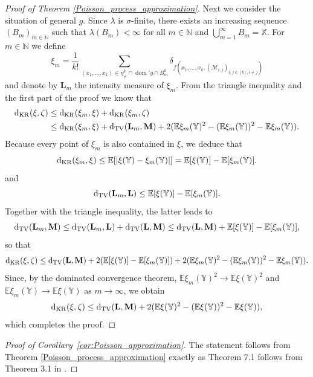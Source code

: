 \documentclass{article}
\theoremstyle{definition}
\numberwithin{equation}{section}
\theoremstyle{remark}
\newcommand{\E}{\mathbb{E}}
\begin{document}
\begin{proof}[Proof of Theorem \ref{Poisson_process_approximation}]
Next we consider the situation of general $g$. Since $\lambda$ is $\sigma$-finite, there exists an increasing sequence $(B_m)_{m\in\mathbb{N}}$ such that $\lambda(B_m)<\infty$ for all $m\in\mathbb{N}$ and $\bigcup_{m=1}^\infty B_m=\mathbb{X}$. For $m\in\mathbb{N}$ we define
$$
\xi_m=\frac{1}{k!}\sum_{(x_1,\ldots,x_k)\in\eta^k_{\neq}\cap \operatorname{dom}'g \cap B_m^k} \delta_{f(x_1,\ldots,x_k,(\mathcal{M}_{i,j})_{i,j\in[k],i\neq j})}
$$
and denote by $\mathbf{L}_m$ the intensity measure of $\xi_m$. From the triangle inequality and the first part of the proof we know that
\begin{align*}
\mathrm{d}_{\rm KR}(\xi,\zeta) & \leq \mathrm{d}_{\rm KR}(\xi_m,\xi) + \mathrm{d}_{\rm KR}(\xi_m,\zeta) \\
			       & \leq  \mathrm{d}_{\rm KR}(\xi_m,\xi) + \mathrm{d}_{\rm TV}(\mathbf{L}_m,\mathbf{M}) + 2(\E\xi_m(\mathbb{Y})^2 - (\E\xi_m(\mathbb{Y}))^2 - \E\xi_m(\mathbb{Y}) ).
\end{align*}
Because every point of $\xi_m$ is also contained in $\xi$, we deduce that
$$
\mathrm{d}_{\rm KR}(\xi_m,\xi) \leq \E[|\xi(\mathbb{Y})-\xi_m(\mathbb{Y})|] = \E[\xi(\mathbb{Y})] - \E[\xi_m(\mathbb{Y})].
$$
and
$$
\mathrm{d}_{\rm TV}(\mathbf{L}_m,\mathbf{L}) \leq \E[\xi(\mathbb{Y})] - \E[\xi_m(\mathbb{Y})].
$$
Together with the triangle inequality, the latter leads to
$$
\mathrm{d}_{\rm TV}(\mathbf{L}_m,\mathbf{M}) \leq \mathrm{d}_{\rm TV}(\mathbf{L}_m,\mathbf{L}) + \mathrm{d}_{\rm TV}(\mathbf{L},\mathbf{M}) \leq \mathrm{d}_{\rm TV}(\mathbf{L},\mathbf{M})  +  \E[\xi(\mathbb{Y})] - \E[\xi_m(\mathbb{Y})] ,
$$
so that
$$
\mathrm{d}_{\rm KR}(\xi,\zeta) \leq \mathrm{d}_{\rm TV}(\mathbf{L},\mathbf{M})  + 2 (\E[\xi(\mathbb{Y})] - \E[\xi_m(\mathbb{Y})]) + 2(\E\xi_m(\mathbb{Y})^2 - (\E\xi_m(\mathbb{Y}))^2 - \E\xi_m(\mathbb{Y}) ).
$$
Since, by the dominated convergence theorem, $\E\xi_m(\mathbb{Y})^2\to \E\xi(\mathbb{Y})^2$ and $\E\xi_m(\mathbb{Y})\to \E\xi(\mathbb{Y})$ as $m\to\infty$, we obtain
$$
\mathrm{d}_{\rm KR}(\xi,\zeta) \leq \mathrm{d}_{\rm TV}(\mathbf{L},\mathbf{M}) + 2(\E\xi(\mathbb{Y})^2 - (\E\xi(\mathbb{Y}))^2 - \E\xi(\mathbb{Y}) ),
$$
which completes the proof.
\end{proof}


\begin{proof}[Proof of Corollary~\ref{cor:Poisson_approximation}]
The statement follows from Theorem \ref{Poisson_process_approximation} exactly as Theorem 7.1 follows from Theorem 3.1 in \cite{dst}.
\end{proof}
\end{document}
